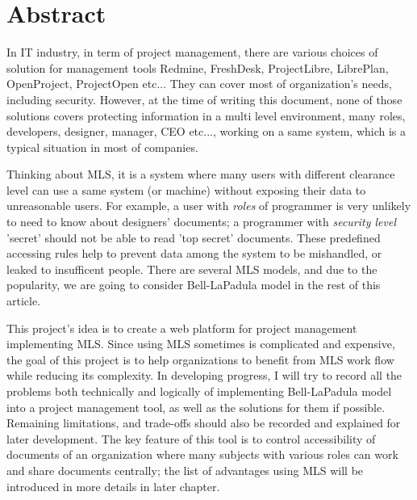 

\begingroup
\let\clearpage\relax
\let\cleardoublepage\relax
\let\cleardoublepage\relax

\chapter*{Abstract} %

In IT industry, in term of project management, there are various choices of solution for management tools \eg Redmine, FreshDesk, ProjectLibre, LibrePlan, OpenProject, ProjectOpen etc...
They can cover most of organization's needs, including security.
However, at the time of writing this document, none of those solutions covers protecting information in a multi level environment, \ie many roles, \eg developers, designer, manager, CEO etc..., working on a same system, which is a typical situation in most of companies. 

Thinking about MLS, it is a system where many users with different clearance level can use a same system (or machine) without exposing their data to unreasonable users.
For example, a user with \emph{roles} of programmer is very unlikely to need to know about designers' documents;
a programmer with \emph{security level} 'secret' should not be able to read 'top secret' documents.
These predefined accessing rules help to prevent data among the system to be mishandled, or leaked to insufficent people.
There are several MLS models, and due to the popularity, we are going to consider Bell-LaPadula model in the rest of this article.

This project's idea is to create a web platform for project management implementing MLS.
Since using MLS sometimes is complicated and expensive, the goal of this project is to help organizations to benefit from MLS work flow while reducing its complexity.
In developing progress, I will try to record all the problems both technically and logically of implementing Bell-LaPadula model into a project management tool, as well as the solutions for them if possible.
Remaining limitations, and trade-offs should also be recorded and explained for later development.
The key feature of this tool is to control accessibility of documents of an organization where many subjects with various roles can work and share documents centrally; the list of advantages using MLS will be introduced in more details in later chapter.

\endgroup			

\vfill
